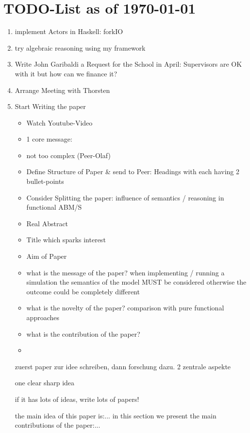 \section{TODO-List as of \today}

\begin{enumerate}
\item implement Actors in Haskell: forkIO

\item try algebraic reasoning using my framework

\item Write John Garibaldi a Request for the School in April: Supervisors are OK with it but how can we finance it?

\item Arrange Meeting with Thorsten

\item Start Writing the paper
	\begin{itemize}
		\item Watch Youtube-Video
		\item 1 core message:
		\item not too complex (Peer-Olaf)
		\item Define Structure of Paper \& send to Peer: Headings with each having 2 bullet-points
		\item Consider Splitting the paper: influence of semantics / reasoning in functional ABM/S
		\item Real Abstract
		\item Title which sparks interest
		\item Aim of Paper
		\item what is the message of the paper? when implementing / running a simulation the semantics of the model MUST be considered otherwise the outcome could be completely different
		\item what is the novelty of the paper? comparison with pure functional approaches
		\item what is the contribution of the paper? 
		\item 
	\end{itemize}
	
	zuerst paper zur idee schreiben, dann forschung dazu. 2 zentrale aspekte
	
one clear sharp idea

if it has lots of ideas, write lots of papers!

the main idea of this paper is:...
in this section we present the main contributions of the paper:...


\end{enumerate}
